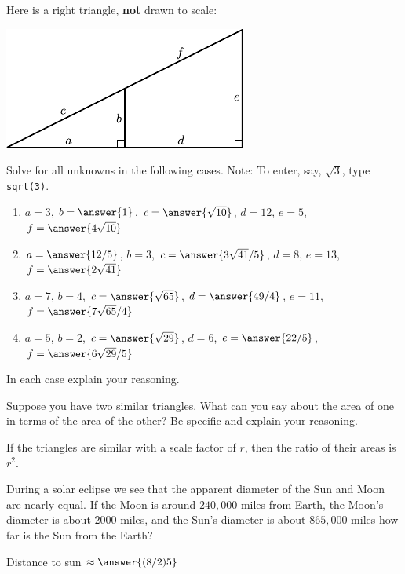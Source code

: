 \documentclass[nooutcomes]{ximera}
\begin{document}
\begin{question}
Here is a right triangle, \textbf{not} drawn to scale:
\begin{image}
\includegraphics{origamiSimQ.pdf}
\end{image}
Solve for all unknowns in the following cases.  Note:  To enter, say, $\sqrt{3}$, type \texttt{sqrt(3)}.
\begin{enumerate}
\item $a = 3$, $b = \answer{1}$, $c = \answer{\sqrt{10}}$, $d = 12$, $e = 5$, $f = \answer{4 \sqrt{10}}$
\item $a = \answer{12/5}$, $b = 3$, $c = \answer{3\sqrt{41}/5}$, $d =8$, $e = 13$, $f = \answer{2\sqrt{41}}$
\item $a = 7$, $b = 4$, $c = \answer{\sqrt{65}}$, $d =\answer{49/4}$, $e = 11$, $f = \answer{7\sqrt{65}/4}$
\item $a = 5$, $b = 2$, $c = \answer{\sqrt{29}}$, $d =6$, $e = \answer{22/5}$, $f = \answer{6\sqrt{29}/5}$
\end{enumerate}
In each case explain your reasoning.
\end{question}

\begin{question}
Suppose you have two similar triangles. What can you say about
  the area of one in terms of the area of the other? Be specific and
  explain your reasoning.
\begin{freeResponse}
\begin{hint}
If the triangles are similar with a scale factor of $r$, then the ratio of their areas is $r^2$. 
\end{hint}
\end{freeResponse}
\end{question}

\begin{question}
During a solar eclipse we see that the apparent diameter of the
  Sun and Moon are nearly equal. If the Moon is around $240,000$ miles
  from Earth, the Moon's diameter is about $2000$ miles, and the Sun's
  diameter is about $865,000$ miles how far is the Sun from the Earth?

Distance to sun $\approx \answer{(8/2)5}$
\end{question}
\end{document}
